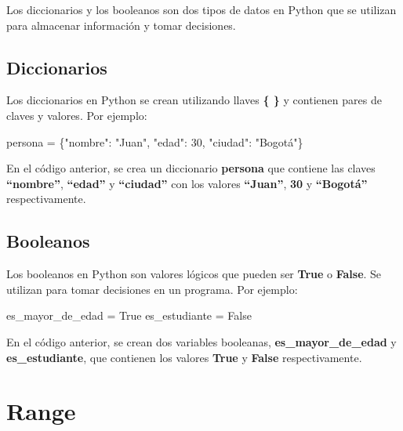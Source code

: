 \documentclass[
  a4paper,
  DIV=11,
  numbers=noendperiod,
  onepage,
  openany]{scrreprt}
\newenvironment{Shaded}{\begin{snugshade}}{\end{snugshade}}
\newcommand{\DecValTok}[1]{\textcolor[rgb]{0.68,0.00,0.00}{#1}}
\newcommand{\NormalTok}[1]{\textcolor[rgb]{0.00,0.23,0.31}{#1}}
\newcommand{\OperatorTok}[1]{\textcolor[rgb]{0.37,0.37,0.37}{#1}}
\newcommand{\StringTok}[1]{\textcolor[rgb]{0.13,0.47,0.30}{#1}}
\newcommand{\VariableTok}[1]{\textcolor[rgb]{0.07,0.07,0.07}{#1}}
\begin{document}
Los diccionarios y los booleanos son dos tipos de datos en Python que se
utilizan para almacenar información y tomar decisiones.

\subsection{Diccionarios}\label{diccionarios}

Los diccionarios en Python se crean utilizando llaves \textbf{\{ \}} y
contienen pares de claves y valores. Por ejemplo:

\begin{Shaded}
\begin{Highlighting}[]
\NormalTok{persona }\OperatorTok{=}\NormalTok{ \{}\StringTok{"nombre"}\NormalTok{: }\StringTok{"Juan"}\NormalTok{, }\StringTok{"edad"}\NormalTok{: }\DecValTok{30}\NormalTok{, }\StringTok{"ciudad"}\NormalTok{: }\StringTok{"Bogotá"}\NormalTok{\}}
\end{Highlighting}
\end{Shaded}

En el código anterior, se crea un diccionario \textbf{persona} que
contiene las claves \textbf{``nombre''}, \textbf{``edad''} y
\textbf{``ciudad''} con los valores \textbf{``Juan''}, \textbf{30} y
\textbf{``Bogotá''} respectivamente.

\subsection{Booleanos}\label{booleanos}

Los booleanos en Python son valores lógicos que pueden ser \textbf{True}
o \textbf{False}. Se utilizan para tomar decisiones en un programa. Por
ejemplo:

\begin{Shaded}
\begin{Highlighting}[]
\NormalTok{es\_mayor\_de\_edad }\OperatorTok{=} \VariableTok{True}
\NormalTok{es\_estudiante }\OperatorTok{=} \VariableTok{False}
\end{Highlighting}
\end{Shaded}

En el código anterior, se crean dos variables booleanas,
\textbf{es\_mayor\_de\_edad} y \textbf{es\_estudiante}, que contienen
los valores \textbf{True} y \textbf{False} respectivamente.

\section{Range}\label{range}
\end{document}
